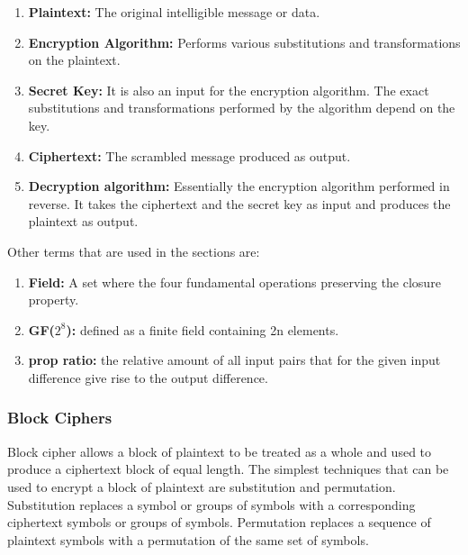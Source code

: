 \documentclass{article}
\begin{document}
\begin{enumerate}
	\item \textbf{Plaintext:} The original intelligible message or data.
	\item \textbf{Encryption Algorithm:} Performs various substitutions and transformations on the plaintext.
	\item \textbf{Secret Key:} It is also an input for the encryption algorithm. The exact substitutions and transformations performed by the algorithm depend on the key.
	\item \textbf{Ciphertext:} The scrambled message produced as output.
	\item \textbf{Decryption algorithm:} Essentially the encryption algorithm performed in reverse. It takes the ciphertext and the secret key as input and produces the plaintext as output.
\end{enumerate}

Other terms that are used in the sections are:
\begin{enumerate}
	\item \textbf{Field:} A set where the four fundamental operations preserving the closure property.\cite{stallings2011}
	\item \textbf{GF($2^{8}$):} defined as a finite field containing 2n elements.\cite{stallings2011}
	\item \textbf{prop ratio:} the relative amount of all input pairs that for the given input difference give rise to the output difference. \cite{daemen1999}
\end{enumerate}

\subsubsection{Block Ciphers}
Block cipher allows a block of plaintext to be treated as a whole and used to produce a ciphertext block of equal length. The simplest techniques that can be used to encrypt a block of plaintext are substitution and permutation. Substitution replaces a symbol or groups of symbols with a corresponding ciphertext symbols or groups of symbols. Permutation replaces a sequence of plaintext symbols with a permutation of the same set of symbols. \cite{stallings2011}
\end{document}
